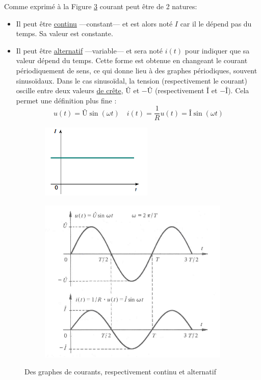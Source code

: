 \documentclass[12pt,a4paper]{article}
\newcommand{\I}{\text{Î} }
\newcommand{\U}{\text{Û} }
\begin{document}
Comme exprimé à la Figure \ref{figs: continu/alternatif} courant peut être de 2 natures: 
\begin{itemize}
	\item 	Il peut être \uline{continu} ---constant--- et est alors noté $I$ car il le dépend pas du temps. Sa valeur est constante.
	\item 	Il peut être \uline{alternatif} ---variable--- et sera noté $i(t)$ pour indiquer que sa valeur dépend du temps. Cette forme est obtenue en changeant le courant périodiquement de sens, ce qui donne lieu à des graphes périodiques, souvent sinusoïdaux. Dans le cas sinusoïdal, la tension (respectivement le courant) oscille entre deux valeurs \uline{de crête}, $\U$ et $-\U$ (respectivement $\I$ et $-\I$). Cela permet une définition plus fine :
	\begin{equation}
		u(t) = \U\sin(\omega t) \quad i(t) = \frac{1}{R}u(t) = \I \sin(\omega t)		
	\end{equation}
\end{itemize}
\begin{figure}[h]
	\centering
	\begin{subfigure}{0.3\textwidth}
		\centering
		\includegraphics[scale=1]{images/continu}
		\label{subfig: continu}
	\end{subfigure}
	\begin{subfigure}{0.6\textwidth}
		\centering
		\includegraphics[scale=0.5]{images/regimes}
		\label{subfig: alternatif}
	\end{subfigure}
	\caption{Des graphes de courants, respectivement continu et alternatif}
	\label{figs: continu/alternatif}
\end{figure}
\end{document}
